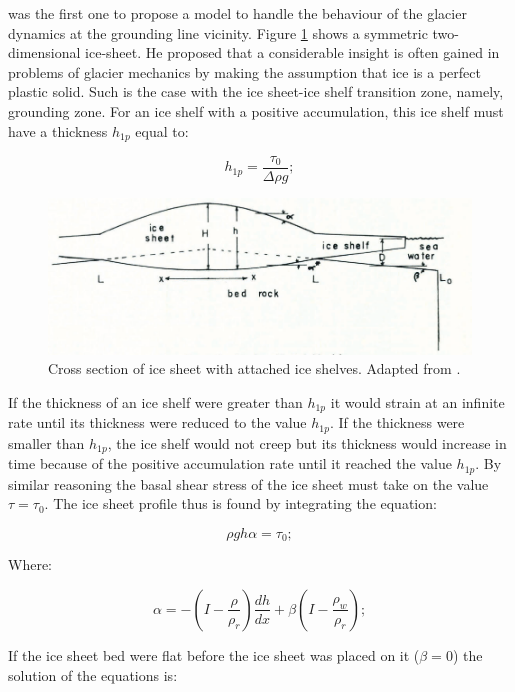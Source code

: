 \documentclass{article}
\begin{document}
\cite{weertman1974stability} was the first one to propose a model to handle the behaviour of the glacier dynamics at the grounding line vicinity. Figure \ref{weertman} shows a symmetric two-dimensional ice-sheet. He proposed that a considerable insight is often gained in problems of glacier mechanics by making the assumption that ice is a perfect plastic solid. Such is the case  with the ice sheet-ice shelf transition zone, namely, grounding zone. For an ice shelf with a positive accumulation, this ice shelf must have a thickness $h_{1p}$ equal to:

\begin{equation}
	h_{1p}=\frac{\tau_0}{\Delta \rho g};
\end{equation}

\begin{figure}[!h]
	\centering
	\includegraphics[width=0.7\linewidth]{../fig/Weertman.png}
	\caption{Cross section of ice sheet with attached ice shelves. Adapted from \cite{weertman1974stability}.}
	\label{weertman}
\end{figure}

If the thickness of an ice shelf were greater than $h_{1p}$ it would strain at an infinite rate until its thickness were reduced to the value $h_{1p}$. If the thickness were smaller than $h_{1p}$, the ice shelf would not creep but its thickness would increase in time because of the positive accumulation rate until it reached the value $h_{1p}$. By similar reasoning the basal shear stress of the ice sheet must take on the value $\tau=\tau_0$. The ice sheet profile thus is found by integrating the equation:

\begin{equation}
	\rho gh\alpha=\tau_0;
\end{equation}

Where:

\begin{equation}
	\alpha=-(I-\frac{\rho}{\rho_r})\frac{dh}{dx}+\beta(I-\frac{\rho_w}{\rho_r});
\end{equation}

If the ice sheet bed were flat before the ice sheet was placed on it ($\beta=0$) the solution of the equations is:
\end{document}
